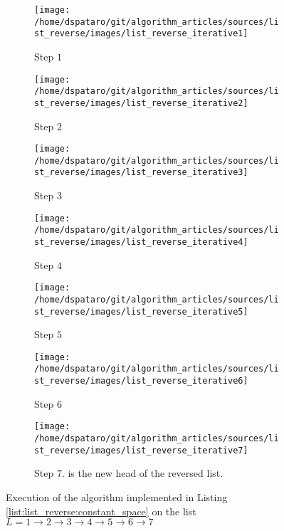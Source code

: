 \begin{figure}
	\vspace*{-0.5in}
	\centering
	\begin{subfigure}[t]{0.49\textwidth}
		\centering
		\texttt{[image: /home/dspataro/git/algorithm\_articles/sources/list\_reverse/images/list\_reverse\_iterative1]}
		\caption[]{Step $1$}
		\label{fig:list_reverse:list_reverse_iterative1}
	 \end{subfigure}
	\hfill
	\begin{subfigure}[t]{0.49\textwidth}
		\centering
		\texttt{[image: /home/dspataro/git/algorithm\_articles/sources/list\_reverse/images/list\_reverse\_iterative2]}
		\caption[]{Step $2$}
		\label{fig:list_reverse:list_reverse_iterative1}
	 \end{subfigure}
	 \hfill
	 \begin{subfigure}[t]{0.49\textwidth}
		\centering
		\texttt{[image: /home/dspataro/git/algorithm\_articles/sources/list\_reverse/images/list\_reverse\_iterative3]}
		\caption[]{Step $3$}
		\label{fig:list_reverse:list_reverse_iterative1}
	 \end{subfigure}
	 \hfill
	 \begin{subfigure}[t]{0.49\textwidth}
		\centering
		\texttt{[image: /home/dspataro/git/algorithm\_articles/sources/list\_reverse/images/list\_reverse\_iterative4]}
		\caption[]{Step $4$}
		\label{fig:list_reverse:list_reverse_iterative1}
	 \end{subfigure}
	 \hfill
	 \begin{subfigure}[t]{0.49\textwidth}
		\centering
		\texttt{[image: /home/dspataro/git/algorithm\_articles/sources/list\_reverse/images/list\_reverse\_iterative5]}
		\caption[]{Step $5$}
		\label{fig:list_reverse:list_reverse_iterative1}
	 \end{subfigure}
	 \hfill
	 \begin{subfigure}[t]{0.49\textwidth}
		\centering
		\texttt{[image: /home/dspataro/git/algorithm\_articles/sources/list\_reverse/images/list\_reverse\_iterative6]}
		\caption[]{Step $6$}
		\label{fig:list_reverse:list_reverse_iterative1}
	 \end{subfigure}
	 \hfill
	 \begin{subfigure}[t]{0.49\textwidth}
		\centering
		\texttt{[image: /home/dspataro/git/algorithm\_articles/sources/list\_reverse/images/list\_reverse\_iterative7]}
		\caption[]{Step $7$.  is the new head of the reversed list.}
		\label{fig:list_reverse:list_reverse_iterative7}
	 \end{subfigure}
\caption{Execution of the algorithm implemented in Listing \ref{list:list_reverse:constant_space} on the list $L = 1 \rightarrow 2 \rightarrow 3 \rightarrow 4 \rightarrow 5 \rightarrow 6 \rightarrow 7$}
\label{fig:list_reverse:list_reverse_iterative_execution}
\end{figure}

